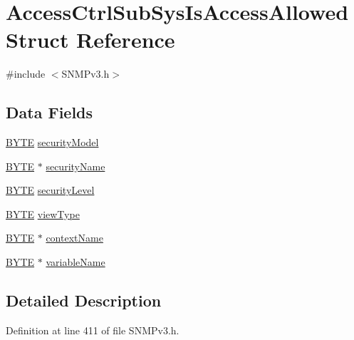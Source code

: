 \hypertarget{struct_access_ctrl_sub_sys_is_access_allowed}{}\section{Access\+Ctrl\+Sub\+Sys\+Is\+Access\+Allowed Struct Reference}
\label{struct_access_ctrl_sub_sys_is_access_allowed}


{\ttfamily \#include $<$S\+N\+M\+Pv3.\+h$>$}

\subsection*{Data Fields}
\begin{DoxyCompactItemize}
\item 
\hyperlink{_generic_type_defs_8h_a4ae1dab0fb4b072a66584546209e7d58}{B\+Y\+T\+E} \hyperlink{struct_access_ctrl_sub_sys_is_access_allowed_ac19ed44216346e9d6c50819813db6867}{security\+Model}
\item 
\hyperlink{_generic_type_defs_8h_a4ae1dab0fb4b072a66584546209e7d58}{B\+Y\+T\+E} $\ast$ \hyperlink{struct_access_ctrl_sub_sys_is_access_allowed_a4a48a8746988a1f761c3e9eadcc20463}{security\+Name}
\item 
\hyperlink{_generic_type_defs_8h_a4ae1dab0fb4b072a66584546209e7d58}{B\+Y\+T\+E} \hyperlink{struct_access_ctrl_sub_sys_is_access_allowed_a9314d7b462ce4cc59202ed48fcdd9945}{security\+Level}
\item 
\hyperlink{_generic_type_defs_8h_a4ae1dab0fb4b072a66584546209e7d58}{B\+Y\+T\+E} \hyperlink{struct_access_ctrl_sub_sys_is_access_allowed_add1bbedb5b5e570f44f7da6aa5f3d2e4}{view\+Type}
\item 
\hyperlink{_generic_type_defs_8h_a4ae1dab0fb4b072a66584546209e7d58}{B\+Y\+T\+E} $\ast$ \hyperlink{struct_access_ctrl_sub_sys_is_access_allowed_af55ce5882ccbc8435fb33f1020c74550}{context\+Name}
\item 
\hyperlink{_generic_type_defs_8h_a4ae1dab0fb4b072a66584546209e7d58}{B\+Y\+T\+E} $\ast$ \hyperlink{struct_access_ctrl_sub_sys_is_access_allowed_a65f4f9825a516d82460aee835aac4c9a}{variable\+Name}
\end{DoxyCompactItemize}


\subsection{Detailed Description}


Definition at line 411 of file S\+N\+M\+Pv3.\+h.



